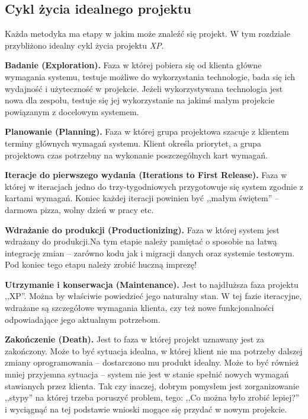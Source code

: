 \subsection{Cykl życia idealnego projektu}
\label{sec:ZMTOcykl}

Każda metodyka ma etapy w jakim może znaleźć się projekt. W tym rozdziale przybliżono idealny cykl życia projektu \textit{XP}.

\begin{packed_enum}
    \item \textbf{Badanie (Exploration).} Faza w której pobiera się od klienta główne wymagania systemu, testuje możliwe do wykorzystania technologie, bada się ich wydajność i użyteczność w projekcie. Jeżeli wykorzystywana technologia jest nowa dla zespołu, testuje się jej wykorzystanie na jakimś małym projekcie powiązanym z docelowym systemem.
    \item \textbf{Planowanie (Planning).} Faza w której grupa projektowa szacuje z klientem terminy głównych wymagań systemu. Klient określa priorytet, a grupa projektowa czas potrzebny na wykonanie poszczególnych kart wymagań.
    \item \textbf{Iteracje do pierwszego wydania (Iterations to First Release).} Faza w której w iteracjach jedno do trzy-tygodniowych przygotowuje się system zgodnie z kartami wymagań. Koniec każdej iteracji powinien być ,,małym świętem'' -- darmowa pizza, wolny dzień w pracy etc.
    \item \textbf{Wdrażanie do produkcji (Productionizing).} Faza w której system jest wdrażany do produkcji.Na tym etapie należy pamiętać o sposobie na łatwą integrację zmian -- zarówno kodu jak i migracji danych oraz systemie testowym. Pod koniec tego etapu należy zrobić huczną imprezę!
    \item \textbf{Utrzymanie i konserwacja (Maintenance).} Jest to najdłuższa faza projektu ,,XP''. Można by właściwie powiedzieć jego naturalny stan. W tej fazie iteracyjne, wdrażane są szczegółowe wymagania klienta, czy też nowe funkcjonalności odpowiadające jego aktualnym potrzebom.
    \item \textbf{Zakończenie (Death).} Jest to faza w której projekt uznawany jest za zakończony. Może to być sytuacja idealna, w której klient nie ma potrzeby dalszej zmiany oprogramowania -- dostarczono mu produkt idealny. Może to być również mniej przyjemna sytuacja -- system nie jest w stanie spełnić nowych wymagań stawianych przez klienta. Tak czy inaczej, dobrym pomysłem jest zorganizowanie ,,stypy'' na której trzeba poruszyć problem, tego: ,,Co można było zrobić lepiej?'' i wyciągnąć na tej podstawie wnioski mogące się przydać w nowym projekcie.
\end{packed_enum}

